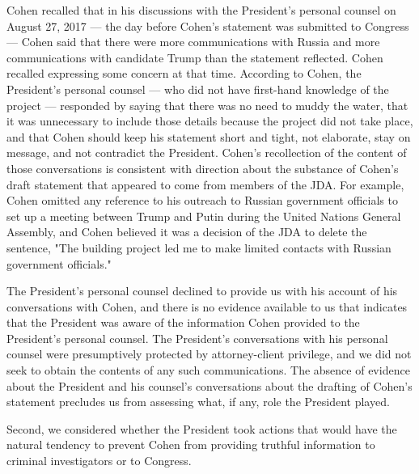 {Cohen recalled that in his discussions with the President's personal counsel on August 27, 2017 — the day before Cohen's statement was submitted to Congress — Cohen said that there were more communications with Russia and more communications with candidate Trump than the statement reflected.
Cohen recalled expressing some concern at that time.
According to Cohen, the President's personal counsel — who did not have first-hand knowledge of the project — responded by saying that there was no need to muddy the water, that it was unnecessary to include those details because the project did not take place, and that Cohen should keep his statement short and tight, not elaborate, stay on message, and not contradict the President.
Cohen's recollection of the content of those conversations is consistent with direction about the substance of Cohen's draft statement that appeared to come from members of the JDA.
For example, Cohen omitted any reference to his outreach to Russian government officials to set up a meeting between Trump and Putin during the United Nations General Assembly, and Cohen believed it was a decision of the JDA to delete the sentence, "The building project led me to make limited contacts with Russian government officials."

The President's personal counsel declined to provide us with his account of his conversations with Cohen, and there is no evidence available to us that indicates that the President was aware of the information Cohen provided to the President's personal counsel.
The President's conversations with his personal counsel were presumptively protected by attorney-client privilege, and we did not seek to obtain the contents of any such communications.
The absence of evidence about the President and his counsel's conversations about the drafting of Cohen's statement precludes us from assessing what, if any, role the President played.

Second, we considered whether the President took actions that would have the natural tendency to prevent Cohen from providing truthful information to criminal investigators or to Congress.

}
